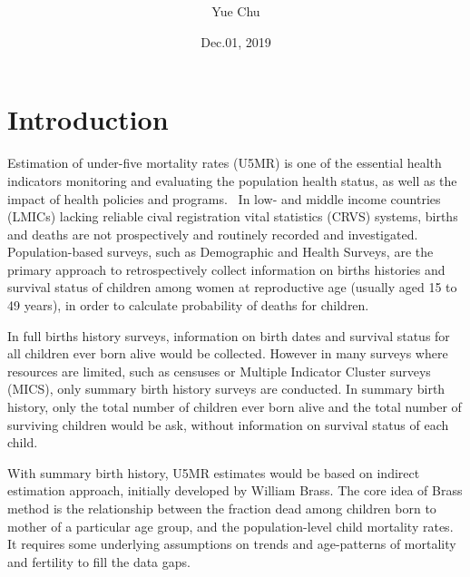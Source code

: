 \documentclass[11pt,letterpaper]{article}
\begin{document}


\title{
\vspace{2cm}}

\author[*]{Yue Chu}
\date{Dec.01, 2019 \vspace*{\fill}}

\maketitle
{}


\section{Introduction}

Estimation of under-five mortality rates (U5MR) is one of the essential health indicators monitoring and evaluating the population health status, as well as the impact of health policies and programs.~\cite{sdgsResolution2015} In low- and middle income countries (LMICs) lacking reliable cival registration vital statistics (CRVS) systems, births and deaths are not prospectively and routinely recorded and investigated. Population-based surveys, such as Demographic and Health Surveys, are the primary approach to retrospectively collect information on births histories and survival status of children among women at reproductive age (usually aged 15 to 49 years), in order to calculate probability of deaths for children.~\cite{Mathers:2010tq}

In full births history surveys, information on birth dates and survival status for all children ever born alive would be collected. However in many surveys where resources are limited, such as censuses or Multiple Indicator Cluster surveys (MICS), only summary birth history surveys are conducted. In summary birth history, only the total number of children ever born alive and the total number of surviving children would be ask, without information on survival status of each child. 

With summary birth history, U5MR estimates would be based on indirect estimation approach, initially developed by William Brass. \cite{Brass:1975vl} The core idea of Brass method is the relationship between the fraction dead among children born to mother of a particular age group, and the population-level child mortality rates. It requires some underlying assumptions on trends and age-patterns of mortality and fertility to fill the data gaps. 
\end{document}
